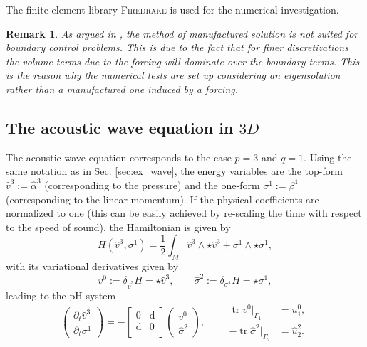 \documentclass{elsarticle}
\newcommand{\revTwo}[1]{{\color{black}#1}}
\newtheorem{remark}{Remark}
\renewcommand\d{\ensuremath{\mathrm{d}}}
\DeclareMathOperator{\tr}{tr}
\newcommand*{\dual}[1]{\ensuremath{\widehat{#1}}}
\newcommand{\firedrake}{\textsc{Firedrake}\xspace}
\begin{document}
The finite element library \firedrake \cite{rathgeber2017firedrake} is used for the numerical investigation.

\begin{remark}
As argued in \cite{benner2015timebc}, the method of manufactured solution is not suited for boundary control problems. This is due to the fact that for finer discretizations the volume terms due to the forcing will dominate over the boundary terms. This is the reason why the numerical tests are set up considering an eigensolution rather than a manufactured one induced by a forcing.
\end{remark}

\subsection{The acoustic wave equation in $3D$}

The acoustic wave equation corresponds to the case $p=3$ and $q=1$. \revTwo{Using the same notation as in Sec. \ref{sec:ex_wave},} the energy variables are the top-form $\dual{v}^3:=\dual{\alpha}^3$ (corresponding to the pressure) and the one-form $\sigma^1:=\beta^{1}$ (corresponding to the linear momentum). If the physical coefficients are normalized to one (this can be easily achieved by re-scaling the time with respect to the speed of sound), the Hamiltonian is given by
\begin{equation}
    H(\dual{v}^3, \sigma^1) = \frac{1}{2} \int_M \dual{v}^3 \wedge {\star \dual{v}^3} + \sigma^1 \wedge \star \sigma^1,
\end{equation}
with its variational derivatives given by
\begin{equation}
v^0:=\delta_{\dual{v}^3} H = \star \dual{v}^3, \qquad  \dual{\sigma}^2:= \delta_{\sigma^1} H = \star \sigma^1,  
\end{equation}
leading to the pH system
\begin{equation}\label{eq:wave_eq}
    \begin{pmatrix}
    \partial_t \dual{v}^3 \\
    \partial_t \sigma^1
    \end{pmatrix} =
    -
    \begin{bmatrix}
    0 & \d \\
    \d & 0 \\
    \end{bmatrix}
    \begin{pmatrix}
     v^0 \\
     \dual{\sigma}^2
    \end{pmatrix}, \qquad 
    \begin{aligned}
    \tr v^0 \vert_{\Gamma_1} &= u^{0}_1, \\
    -\tr \dual{\sigma}^2 \vert_{\Gamma_2} &= \dual{u}^2_2.
 \end{aligned}
\end{equation}
\end{document}
